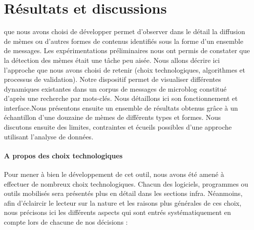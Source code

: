 \chapter{Résultats et discussions}

 que nous avons choisi de développer permet d'observer dans le détail la diffusion de mèmes ou d'autres formes de contenus identifiés sous la forme d'un ensemble de messages. Les expérimentations préliminaires nous ont permis de constater que la détection des mèmes était une tâche peu aisée. Nous allons décrire ici l'approche que nous avons choisi de retenir (choix technologiques, algorithmes et processus de validation). Notre dispositif permet de visualiser différentes dynamiques existantes dans un corpus de messages de microblog constitué d'après une recherche par mots-clés. Nous détaillons ici son fonctionnement et interface.Nous présentons ensuite un ensemble de résultats obtenus grâce à un échantillon d'une douzaine de mèmes de différents types et formes. Nous discutons ensuite des limites, contraintes et écueils possibles d'une approche utilisant l'analyse de données.

\subsubsection{A propos des choix technologiques}

    Pour mener à bien le développement de cet outil, nous avons été amené à effectuer de nombreux choix technologiques. Chacun des logiciels, programmes ou outils mobilisés sera présentés plus en détail dans les sections infra. Néanmoins, afin d'éclaircir le lecteur sur la nature et les raisons plus générales de ces choix, nous précisons ici les différents aspects qui sont entrés systématiquement en compte lors de chacune de  nos décisions :

